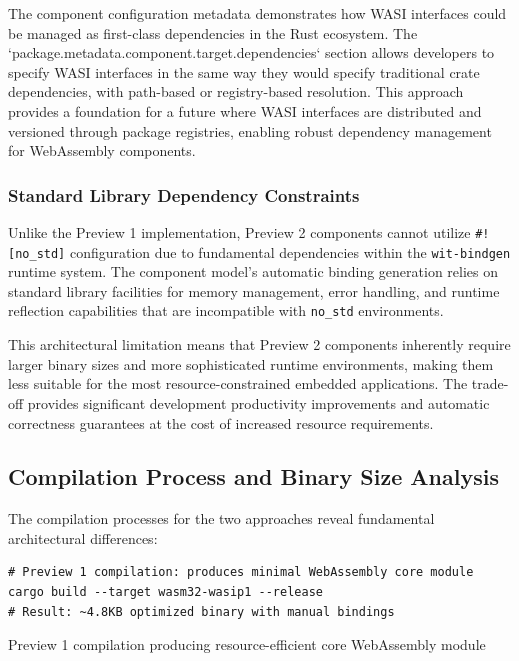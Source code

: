 The component configuration metadata demonstrates how WASI interfaces could be managed as first-class dependencies in the Rust ecosystem. The `package.metadata.component.target.dependencies` section allows developers to specify WASI interfaces in the same way they would specify traditional crate dependencies, with path-based or registry-based resolution. This approach provides a foundation for a future where WASI interfaces are distributed and versioned through package registries, enabling robust dependency management for WebAssembly components.

\subsubsection{Standard Library Dependency Constraints}

Unlike the Preview 1 implementation, Preview 2 components cannot utilize \texttt{\#![no\_std]} configuration due to fundamental dependencies within the \texttt{wit-bindgen} runtime system. The component model's automatic binding generation relies on standard library facilities for memory management, error handling, and runtime reflection capabilities that are incompatible with \texttt{no\_std} environments.

This architectural limitation means that Preview 2 components inherently require larger binary sizes and more sophisticated runtime environments, making them less suitable for the most resource-constrained embedded applications. The trade-off provides significant development productivity improvements and automatic correctness guarantees at the cost of increased resource requirements.

\subsection{Compilation Process and Binary Size Analysis}

The compilation processes for the two approaches reveal fundamental architectural differences:

\begin{listing}[H]
\begin{verbatim}
# Preview 1 compilation: produces minimal WebAssembly core module
cargo build --target wasm32-wasip1 --release
# Result: ~4.8KB optimized binary with manual bindings
\end{verbatim}
\caption{Preview 1 compilation producing resource-efficient core WebAssembly module}
\label{lst:preview1-compilation}
\end{listing}

